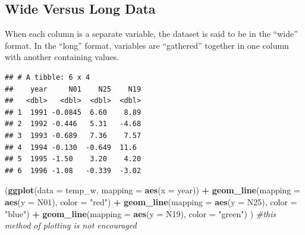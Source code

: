 \documentclass[]{article}
\newenvironment{Shaded}{\begin{snugshade}}{\end{snugshade}}
\newcommand{\KeywordTok}[1]{\textcolor[rgb]{0.13,0.29,0.53}{\textbf{#1}}}
\newcommand{\DataTypeTok}[1]{\textcolor[rgb]{0.13,0.29,0.53}{#1}}
\newcommand{\DecValTok}[1]{\textcolor[rgb]{0.00,0.00,0.81}{#1}}
\newcommand{\StringTok}[1]{\textcolor[rgb]{0.31,0.60,0.02}{#1}}
\newcommand{\CommentTok}[1]{\textcolor[rgb]{0.56,0.35,0.01}{\textit{#1}}}
\newcommand{\OperatorTok}[1]{\textcolor[rgb]{0.81,0.36,0.00}{\textbf{#1}}}
\newcommand{\NormalTok}[1]{#1}
\begin{document}
\subsection{Wide Versus Long Data}\label{wide-versus-long-data}

When each column is a separate variable, the dataset is said to be in
the ``wide'' format. In the ``long'' format, variables are ``gathered''
together in one column with another containing values.

\begin{Shaded}
\end{Shaded}

\begin{verbatim}
## # A tibble: 6 x 4
##    year     N01    N25    N19
##   <dbl>   <dbl>  <dbl>  <dbl>
## 1  1991 -0.0845  6.60    8.89
## 2  1992 -0.446   5.31   -4.68
## 3  1993 -0.689   7.36    7.57
## 4  1994 -0.130  -0.649  11.6 
## 5  1995 -1.50    3.20    4.20
## 6  1996 -1.08   -0.339  -3.02
\end{verbatim}

\begin{Shaded}
\begin{Highlighting}[]
\NormalTok{(}\KeywordTok{ggplot}\NormalTok{(}\DataTypeTok{data =}\NormalTok{ temp_w,}
        \DataTypeTok{mapping =} \KeywordTok{aes}\NormalTok{(}\DataTypeTok{x =}\NormalTok{ year)) }\OperatorTok{+}\StringTok{ }
\StringTok{    }\KeywordTok{geom_line}\NormalTok{(}\DataTypeTok{mapping =} \KeywordTok{aes}\NormalTok{(}\DataTypeTok{y =}\NormalTok{ N01), }\DataTypeTok{color =} \StringTok{"red"}\NormalTok{) }\OperatorTok{+}
\StringTok{    }\KeywordTok{geom_line}\NormalTok{(}\DataTypeTok{mapping =} \KeywordTok{aes}\NormalTok{(}\DataTypeTok{y =}\NormalTok{ N25), }\DataTypeTok{color =} \StringTok{"blue"}\NormalTok{) }\OperatorTok{+}
\StringTok{    }\KeywordTok{geom_line}\NormalTok{(}\DataTypeTok{mapping =} \KeywordTok{aes}\NormalTok{(}\DataTypeTok{y =}\NormalTok{ N19), }\DataTypeTok{color =} \StringTok{"green"}\NormalTok{)}
\NormalTok{  ) }\CommentTok{#this method of plotting is not encouraged}
\end{Highlighting}
\end{Shaded}
\end{document}

